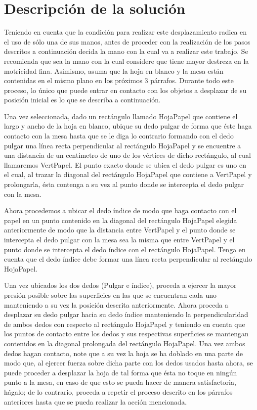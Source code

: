 \documentclass{article}
\begin{document}
\section{Descripción de la solución}\label{solución}
Teniendo en cuenta que la condición para realizar este desplazamiento radica en el uso de sólo una de sus manos, antes de proceder con la realización de los pasos descritos a continuación decida la mano con la cual va a realizar este trabajo. Se recomienda que sea la mano con la cual considere que tiene mayor destreza en la motricidad fina. Asimismo, asuma que la hoja en blanco y la mesa están contenidas en el mismo plano en los próximos 3 párrafos. Durante todo este proceso, lo único que puede entrar en contacto con los objetos a desplazar de su posición inicial es lo que se describa a continuación.

Una vez seleccionada, dado un rectángulo llamado HojaPapel que contiene el largo y ancho de la hoja en blanco, ubique su dedo pulgar de forma que éste haga contacto con la mesa hasta que se le diga lo contrario formando con el dedo pulgar una línea recta perpendicular al rectángulo HojaPapel y se encuentre a una distancia de un centímetro de uno de los vértices de dicho rectángulo, al cual llamaremos VertPapel. El punto exacto donde se ubica el dedo pulgar es uno en el cual, al trazar la diagonal del rectángulo HojaPapel que contiene a VertPapel y prolongarla, ésta contenga a su vez al punto donde se intercepta el dedo pulgar con la mesa.

Ahora procedemos a ubicar el dedo índice de modo que haga contacto con el papel en un punto contenido en la diagonal del rectángulo HojaPapel elegida anteriormente de modo que la distancia entre VertPapel y el punto donde se intercepta el dedo pulgar con la mesa sea la misma que entre VertPapel y el punto donde se intercepta el dedo índice con el rectángulo HojaPapel. Tenga en cuenta que el dedo índice debe formar una línea recta perpendicular al rectángulo HojaPapel.

Una vez ubicados los dos dedos (Pulgar e índice), proceda a ejercer la mayor presión posible sobre las superficies en las que se encuentran cada uno manteniendo a su vez la posición descrita anteriormente. Ahora proceda a desplazar su dedo pulgar hacia su dedo índice manteniendo la perpendicularidad de ambos dedos con respecto al rectángulo HojaPapel y teniendo en cuenta que los puntos de contacto entre los dedos y sus respectivas superficies se mantengan contenidos en la diagonal prolongada del rectángulo HojaPapel. Una vez ambos dedos hagan contacto, note que a su vez la hoja se ha doblado en una parte de modo que, al ejercer fuerza sobre dicha parte con los dedos usados hasta ahora, se puede proceder a desplazar la hoja de tal forma que ésta no toque en ningún punto a la mesa, en caso de que esto se pueda hacer de manera satisfactoria, hágalo; de lo contrario, proceda a repetir el proceso descrito en los párrafos anteriores hasta que se pueda realizar la acción mencionada.
\end{document}
